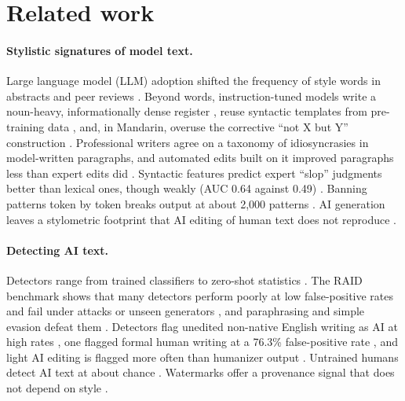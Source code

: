 \documentclass[11pt]{article}
\begin{document}
\section{Related work}

\paragraph{Stylistic signatures of model text.} Large language model (LLM) adoption shifted the frequency of style words in abstracts and peer reviews \citep{kobak2025delving,liang2024monitoring,juzek2025delve,geng2024chatgpt}. Beyond words, instruction-tuned models write a noun-heavy, informationally dense register \citep{reinhart2025llms}, reuse syntactic templates from pre-training data \citep{shaib2024syntactic}, and, in Mandarin, overuse the corrective ``not X but Y'' construction \citep{peng2026notx}. Professional writers agree on a taxonomy of idiosyncrasies in model-written paragraphs, and automated edits built on it improved paragraphs less than expert edits did \citep{chakrabarty2025salvaged}. Syntactic features predict expert ``slop'' judgments better than lexical ones, though weakly (AUC 0.64 against 0.49) \citep{shaib2026slop}. Banning patterns token by token breaks output at about 2,000 patterns \citep{paech2026antislop}. AI generation leaves a stylometric footprint that AI editing of human text does not reproduce \citep{shan2026stylometric}.

\paragraph{Detecting AI text.} Detectors range from trained classifiers \citep{adam2026gptzero} to zero-shot statistics \citep{mitchell2023detectgpt,bao2024fastdetectgpt,hans2024binoculars}. The RAID benchmark shows that many detectors perform poorly at low false-positive rates and fail under attacks or unseen generators \citep{dugan2024raid}, and paraphrasing and simple evasion defeat them \citep{krishna2023paraphrasing,sadasivan2025reliably,perkins2024simple,weberwulff2023testing}. Detectors flag unedited non-native English writing as AI at high rates \citep{liang2023biased}, one flagged formal human writing at a 76.3\% false-positive rate \citep{creanga2026paradox}, and light AI editing is flagged more often than humanizer output \citep{karr2026detection}. Untrained humans detect AI text at about chance \citep{clark2021human,jakesch2023heuristics}. Watermarks offer a provenance signal that does not depend on style \citep{kirchenbauer2023watermark,dathathri2024synthid}.
\end{document}
